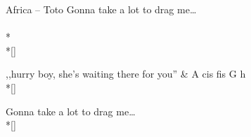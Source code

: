 {\begin{piosenka_dluga}[2mm]{Africa -- Toto}
 Gonna take a lot to drag me\ldots \\[\zwrotkaspace]
 
\\*
\\*[\zwrotkaspace]

 ,,hurry boy, she's waiting there for you'' & A cis fis G h \\*[\zwrotkaspace]

 Gonna take a lot to drag me\ldots \\*[\zwrotkaspace]

\end{piosenka_dluga} }